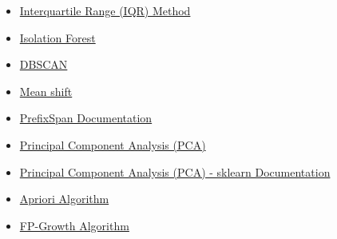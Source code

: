 \documentclass[11pt, a4paper, oneside]{Thesis} %
\begin{document}
\begin{itemize}
  \item \href{https://en.wikipedia.org/wiki/Interquartile_range}{Interquartile Range (IQR) Method} \cite{iqr_method}
  \item \href{https://cs.nju.edu.cn/zhouzh/zhouzh.files/publication/icdm08b.pdf}{Isolation Forest} \cite{liu2008isolation}
  \item \href{https://en.wikipedia.org/wiki/DBSCAN}{DBSCAN} \cite{dbscan}
  \item \href{https://en.wikipedia.org/wiki/Mean_shift}{Mean shift} \cite{mean_shift}
  \item \href{https://www.borgelt.net/prefixspan/prefixspan.pdf}{PrefixSpan Documentation} \cite{prefixspan}
  \item \href{https://en.wikipedia.org/wiki/Principal_component_analysis}{Principal Component Analysis (PCA)} \cite{pca}
  \item \href{https://scikit-learn.org/stable/modules/generated/sklearn.decomposition.PCA.html}{Principal Component Analysis (PCA) - sklearn Documentation} \cite{pca_sklearn}
  \item \href{https://en.wikipedia.org/wiki/Apriori_algorithm}{Apriori Algorithm} \cite{apriori}
  \item \href{https://en.wikipedia.org/wiki/FP-growth}{FP-Growth Algorithm} \cite{fp_growth}
\end{itemize}

\printbibliography
\end{document}
